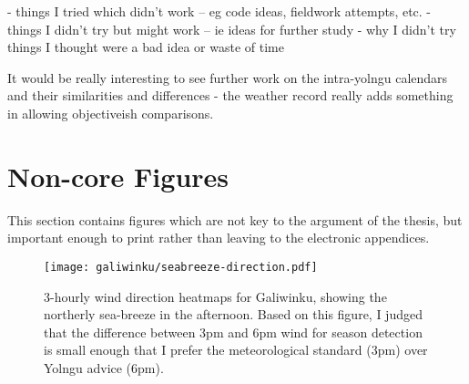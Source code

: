 -	things I tried which didn't work – eg code ideas, fieldwork attempts, etc.
-	things I didn't try but might work – ie ideas for further study
-	why I didn't try things I thought were a bad idea or waste of time

It would be really interesting to see further work on the intra-yolngu calendars and their similarities and differences - the weather record really adds something in allowing objectiveish comparisons.


\section{Non-core Figures}
This section contains figures which are not key to the argument of the thesis,
but important enough to print rather than leaving to the electronic appendices.

\begin{figure}[p]
    \centering
    \texttt{[image: galiwinku/seabreeze-direction.pdf]}
    \caption[3-hourly wind direction heatmaps, Galiwinku]{
        3-hourly wind direction heatmaps for Galiwinku,
        showing the northerly sea-breeze in the afternoon.
        Based on this figure, I judged that the difference between
        3pm and 6pm wind for season detection is small enough that
        I prefer the meteorological standard (3pm) over Yolngu advice (6pm).}
    \label{fig:galiwinku-seabreeze-direction}
\end{figure}

